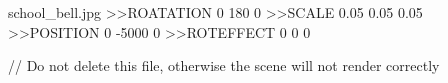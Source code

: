 school_bell.jpg
>>ROATATION
0
180
0
>>SCALE
0.05
0.05
0.05
>>POSITION
0
-5000
0
>>ROTEFFECT
0
0
0

// Do not delete this file, otherwise the scene will not render correctly
